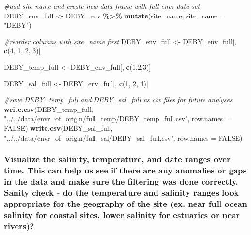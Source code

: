 \documentclass[
]{article}
\newenvironment{Shaded}{\begin{snugshade}}{\end{snugshade}}
\newcommand{\AttributeTok}[1]{\textcolor[rgb]{0.13,0.29,0.53}{#1}}
\newcommand{\CommentTok}[1]{\textcolor[rgb]{0.56,0.35,0.01}{\textit{#1}}}
\newcommand{\ConstantTok}[1]{\textcolor[rgb]{0.56,0.35,0.01}{#1}}
\newcommand{\DecValTok}[1]{\textcolor[rgb]{0.00,0.00,0.81}{#1}}
\newcommand{\FunctionTok}[1]{\textcolor[rgb]{0.13,0.29,0.53}{\textbf{#1}}}
\newcommand{\NormalTok}[1]{#1}
\newcommand{\OtherTok}[1]{\textcolor[rgb]{0.56,0.35,0.01}{#1}}
\newcommand{\SpecialCharTok}[1]{\textcolor[rgb]{0.81,0.36,0.00}{\textbf{#1}}}
\newcommand{\StringTok}[1]{\textcolor[rgb]{0.31,0.60,0.02}{#1}}
\begin{document}
\begin{Shaded}
\begin{Highlighting}[]
\CommentTok{\#add site name and create new data frame with full envr data set}
\NormalTok{DEBY\_env\_full }\OtherTok{\textless{}{-}}\NormalTok{ DEBY\_env }\SpecialCharTok{\%\textgreater{}\%} 
  \FunctionTok{mutate}\NormalTok{(site\_name, }\AttributeTok{site\_name =} \StringTok{"DEBY"}\NormalTok{)}

\CommentTok{\#reorder columns with site\_name first}
\NormalTok{DEBY\_env\_full }\OtherTok{\textless{}{-}}\NormalTok{ DEBY\_env\_full[, }\FunctionTok{c}\NormalTok{(}\DecValTok{4}\NormalTok{, }\DecValTok{1}\NormalTok{, }\DecValTok{2}\NormalTok{, }\DecValTok{3}\NormalTok{)]}

\NormalTok{DEBY\_temp\_full }\OtherTok{\textless{}{-}}\NormalTok{ DEBY\_env\_full[, }\FunctionTok{c}\NormalTok{(}\DecValTok{1}\NormalTok{,}\DecValTok{2}\NormalTok{,}\DecValTok{3}\NormalTok{)]}

\NormalTok{DEBY\_sal\_full }\OtherTok{\textless{}{-}}\NormalTok{ DEBY\_env\_full[, }\FunctionTok{c}\NormalTok{(}\DecValTok{1}\NormalTok{, }\DecValTok{2}\NormalTok{, }\DecValTok{4}\NormalTok{)]}

\CommentTok{\#save DEBY\_temp\_full and DEBY\_sal\_full as csv files for future analyses}
\FunctionTok{write.csv}\NormalTok{(DEBY\_temp\_full, }\StringTok{"../../data/envr\_of\_origin/full\_temp/DEBY\_temp\_full.csv"}\NormalTok{, }\AttributeTok{row.names =} \ConstantTok{FALSE}\NormalTok{)}
\FunctionTok{write.csv}\NormalTok{(DEBY\_sal\_full, }\StringTok{"../../data/envr\_of\_origin/full\_sal/DEBY\_sal\_full.csv"}\NormalTok{, }\AttributeTok{row.names =} \ConstantTok{FALSE}\NormalTok{)}
\end{Highlighting}
\end{Shaded}

\hypertarget{visualize-the-salinity-temperature-and-date-ranges-over-time.-this-can-help-us-see-if-there-are-any-anomalies-or-gaps-in-the-data-and-make-sure-the-filtering-was-done-correctly.-sanity-check---do-the-temperature-and-salinity-ranges-look-appropriate-for-the-geography-of-the-site-ex.-near-full-ocean-salinity-for-coastal-sites-lower-salinity-for-estuaries-or-near-rivers}{%
\subsubsection{Visualize the salinity, temperature, and date ranges over
time. This can help us see if there are any anomalies or gaps in the
data and make sure the filtering was done correctly. Sanity check - do
the temperature and salinity ranges look appropriate for the geography
of the site (ex. near full ocean salinity for coastal sites, lower
salinity for estuaries or near
rivers)?}\label{visualize-the-salinity-temperature-and-date-ranges-over-time.-this-can-help-us-see-if-there-are-any-anomalies-or-gaps-in-the-data-and-make-sure-the-filtering-was-done-correctly.-sanity-check---do-the-temperature-and-salinity-ranges-look-appropriate-for-the-geography-of-the-site-ex.-near-full-ocean-salinity-for-coastal-sites-lower-salinity-for-estuaries-or-near-rivers}}
\end{document}
